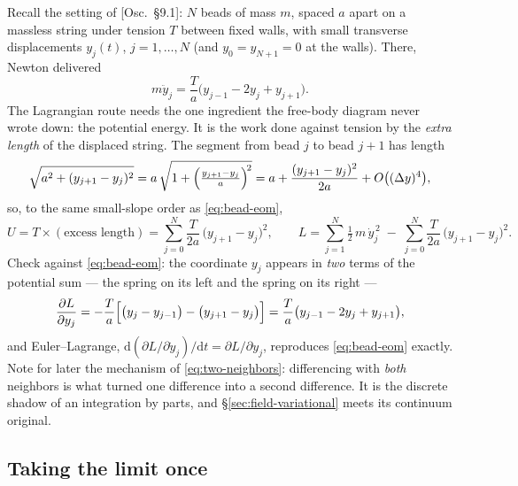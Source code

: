 \documentclass[11pt]{article}
\theoremstyle{plain}
\theoremstyle{definition}
\theoremstyle{remark}
\newcommand{\dd}{\mathrm{d}}
\newcommand{\pd}[2]{\frac{\partial #1}{\partial #2}}
\begin{document}
Recall the setting of [Osc.\ \S9.1]: $N$ beads of mass $m$, spaced $a$
apart on a massless string under tension $T$ between fixed walls, with
small transverse displacements $y_j(t)$, $j = 1, \dots, N$ (and
$y_0 = y_{N+1} = 0$ at the walls). There, Newton delivered
\begin{equation}
  m\ddot y_j = \frac{T}{a}\bigl(y_{j-1} - 2y_j + y_{j+1}\bigr).
  \label{eq:bead-eom}
\end{equation}
The Lagrangian route needs the one ingredient the free-body diagram
never wrote down: the potential energy. It is the work done against
tension by the \emph{extra length} of the displaced string. The
segment from bead $j$ to bead $j+1$ has length
\begin{equation}
  \sqrt{a^2 + (y_{j+1}-y_j)^2}
  = a\,\sqrt{1 + \Bigl(\tfrac{y_{j+1}-y_j}{a}\Bigr)^{\!2}}
  = a + \frac{(y_{j+1}-y_j)^2}{2a} + O\bigl((\Delta y)^4\bigr),
\end{equation}
so, to the same small-slope order as \eqref{eq:bead-eom},
\begin{equation}
  U = T \times (\text{excess length})
    = \sum_{j=0}^{N} \frac{T}{2a}\,\bigl(y_{j+1}-y_j\bigr)^2 ,
  \qquad
  L = \sum_{j=1}^{N} \tfrac12\, m\,\dot y_j^{\,2}
    \;-\; \sum_{j=0}^{N} \frac{T}{2a}\,\bigl(y_{j+1}-y_j\bigr)^2 .
  \label{eq:chain-lagrangian}
\end{equation}
Check against \eqref{eq:bead-eom}: the coordinate $y_j$ appears in
\emph{two} terms of the potential sum --- the spring on its left and
the spring on its right ---
\begin{equation}
  \pd{L}{y_j}
  = -\frac{T}{a}\Bigl[
      \bigl(y_j - y_{j-1}\bigr) - \bigl(y_{j+1} - y_j\bigr)
    \Bigr]
  = \frac{T}{a}\bigl(y_{j-1} - 2y_j + y_{j+1}\bigr),
  \label{eq:two-neighbors}
\end{equation}
and Euler--Lagrange, $\dd(\partial L/\partial\dot y_j)/\dd t =
\partial L/\partial y_j$, reproduces \eqref{eq:bead-eom} exactly. Note
for later the mechanism of \eqref{eq:two-neighbors}: differencing with
\emph{both} neighbors is what turned one difference into a second
difference. It is the discrete shadow of an integration by parts, and
\S\ref{sec:field-variational} meets its continuum original.

\subsection{Taking the limit once}
\label{sec:limit-once}
\end{document}
